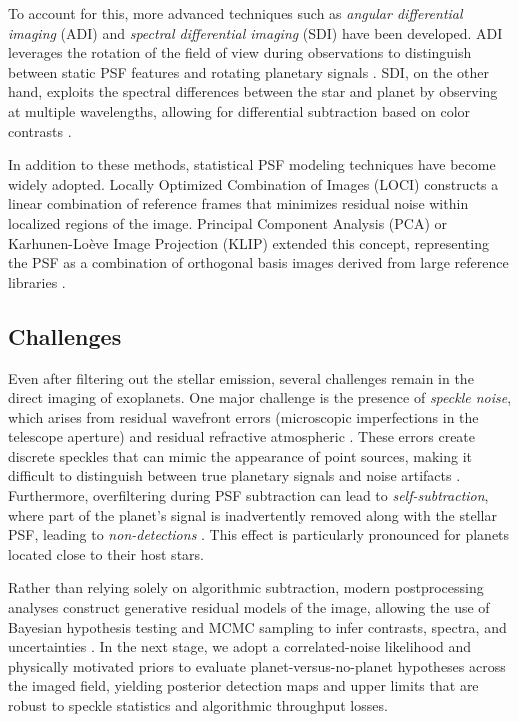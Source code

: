 \documentclass[preprint,longauthor]{aastex631}
\numberwithin{equation}{section}
\begin{document}
To account for this, more advanced techniques such as \textit{angular differential imaging} (ADI) \citep{maroisAngularDifferentialImaging2006} and \textit{spectral differential imaging} (SDI) \citep{folletteIntroductionHighContrast2023} have been developed. ADI leverages the rotation of the field of view during observations to distinguish between static PSF features and rotating planetary signals \citep{maroisAngularDifferentialImaging2006}. SDI, on the other hand, exploits the spectral differences between the star and planet by observing at multiple wavelengths, allowing for differential subtraction based on color contrasts \citep{folletteIntroductionHighContrast2023}.

In addition to these methods, statistical PSF modeling techniques have become widely adopted. Locally Optimized Combination of Images (LOCI) \citep{lafreniereNewAlgorithmPoint2007} constructs a linear combination of reference frames that minimizes residual noise within localized regions of the image. Principal Component Analysis (PCA) or Karhunen-Loève Image Projection (KLIP) extended this concept, representing the PSF as a combination of orthogonal basis images derived from large reference libraries \citep{folletteIntroductionHighContrast2023}.

\subsection{Challenges}

Even after filtering out the stellar emission, several challenges remain in the direct imaging of exoplanets. One major challenge is the presence of \textit{speckle noise}, which arises from residual wavefront errors (microscopic imperfections in the telescope aperture) and residual refractive atmospheric \citep{fischerExoplanetDetectionTechniques2014b}. These errors create discrete speckles that can mimic the appearance of point sources, making it difficult to distinguish between true planetary signals and noise artifacts \citep{fischerExoplanetDetectionTechniques2014b}. Furthermore, overfiltering during PSF subtraction can lead to \textit{self-subtraction}, where part of the planet's signal is inadvertently removed along with the stellar PSF, leading to \textit{non-detections} \citep{kaushikExoplanetDetectionDetailed2024}. This effect is particularly pronounced for planets located close to their host stars.

Rather than relying solely on algorithmic subtraction, modern postprocessing analyses construct generative residual models of the image, allowing the use of Bayesian hypothesis testing and MCMC sampling to infer contrasts, spectra, and uncertainties \citep{ruffioBayesianFrameworkExoplanet2018}. In the next stage, we adopt a correlated-noise likelihood and physically motivated priors to evaluate planet-versus-no-planet hypotheses across the imaged field, yielding posterior detection maps and upper limits that are robust to speckle statistics and algorithmic throughput losses.
\end{document}
